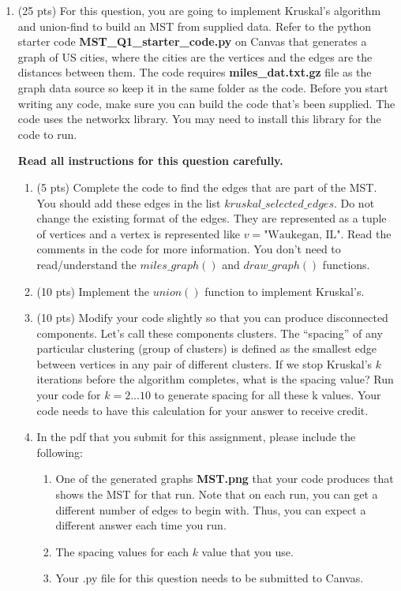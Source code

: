 \documentclass[12pt]{article}
\theoremstyle{remark}
\begin{document}
\hrulefill

\newpage
\begin{enumerate}

\item (25 pts) For this question, you are going to implement Kruskal's algorithm and union-find to build an MST from supplied data. Refer to the python starter code \textbf{MST\_Q1\_starter\_code.py} on Canvas that generates a graph of US cities, where the cities are the vertices and the edges are the distances between them. The code requires \textbf{miles\_dat.txt.gz} file as the graph data source so keep it in the same folder as the code. Before you start writing any code, make sure you can build the code that's been supplied. The code uses the networkx library. You may need to install this library for the code to run.

\textbf{Read all instructions for this question carefully.} 

\begin{enumerate}[label=(\alph*)]

\item (5 pts) Complete the code to find the edges that are part of the MST. You should add these edges in the list $kruskal\_selected\_edges$. Do not change the existing format of the edges. They are represented as a tuple of vertices and a vertex is represented like $v = \text{"Waukegan, IL"}$. Read the comments in the code for more information. You don't need to read/understand the $miles\_graph()$ and $draw\_graph()$ functions. 

\item (10 pts) Implement the $union()$ function to implement Kruskal's.\\


\item (10 pts) Modify your code slightly so that you can produce disconnected components. Let's call these components clusters. The “spacing” of any particular clustering (group of clusters) is defined as the smallest edge between vertices in any pair of different clusters. If we stop Kruskal's $k$ iterations before the algorithm completes, what is the spacing value? Run your code for $k = 2...10$ to generate spacing for all these k values. Your code needs to have this calculation for your answer to receive credit. \\
\item In the pdf that you submit for this assignment, please include the following:
\begin{enumerate}
    \item One of the generated graphs \textbf{MST.png} that your code produces that shows the MST for that run. Note that on each run, you can get a different number of edges to begin with. Thus, you can expect a different answer each time you run.
    \item The spacing values for each $k$ value that you use.
    \item Your .py file for this question needs to be submitted to Canvas.
\end{enumerate}
\pagebreak


\end{enumerate}
\end{enumerate}
\end{document}
